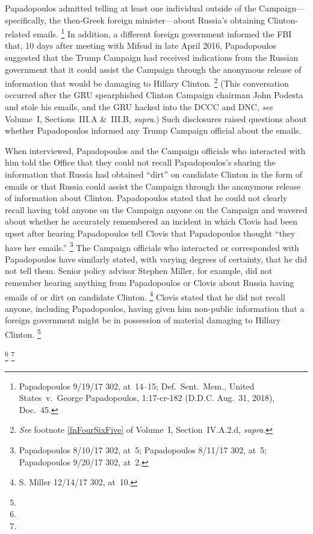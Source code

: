 Papadopoulos admitted telling at least one individual outside of the Campaign---specifically, the then-Greek foreign minister---about Russia's obtaining Clinton-related emails.%
\footnote{Papadopoulos 9/19/17 302, at~14--15;
Def.~Sent.~Mem., United States~v.\ George Papadopoulos, 1:17-cr-182 (D.D.C. Aug.~31, 2018), Doc.~45.}
In addition, a different foreign government informed the FBI that, 10 days after meeting with Mifsud in late April 2016, Papadopoulos suggested that the Trump Campaign had received indications from the Russian government that it could assist the Campaign through the anonymous release of information that would be damaging to Hillary Clinton.%
\footnote{\textit{See} footnote \ref{fnFourSixFive} of Volume~I, Section~IV.A.2.d, \textit{supra}.}
(This conversation occurred after the GRU spearphished Clinton Campaign chairman John Podesta and stole his emails, and the GRU hacked into the DCCC and DNC, \textit{see} Volume~I, Sections~III.A \&~III.B, \textit{supra}.)
Such disclosures raised questions about whether Papadopoulos informed any Trump Campaign official about the emails.

When interviewed, Papadopoulos and the Campaign officials who interacted with him told the Office that they could not recall Papadopoulos's sharing the information that Russia had obtained ``dirt'' on candidate Clinton in the form of emails or that Russia could assist the Campaign through the anonymous release of information about Clinton.
Papadopoulos stated that he could not clearly recall having told anyone on the Campaign anyone on the Campaign and wavered about whether he accurately remembered an incident in which Clovis had been upset after hearing Papadopoulos tell Clovis that Papadopoulos thought ``they have her emails.''%
\footnote{Papadopoulos 8/10/17 302, at~5;
Papadopoulos 8/11/17 302, at~5;
Papadopoulos 9/20/17 302, at~2.}
The Campaign officials who interacted or corresponded with Papadopoulos have similarly stated, with varying degrees of certainty, that he did not tell them.
Senior policy advisor Stephen Miller, for example, did not remember hearing anything from Papadopoulos or Clovis about Russia having emails of or dirt on candidate Clinton.%
\footnote{S. Miller 12/14/17 302, at~10.}
Clovis stated that he did not recall anyone, including Papadopoulos, having given him non-public information that a foreign government might be in possession of material damaging to Hillary Clinton.%
\footnote{}

\footnote{}
\footnote{}

